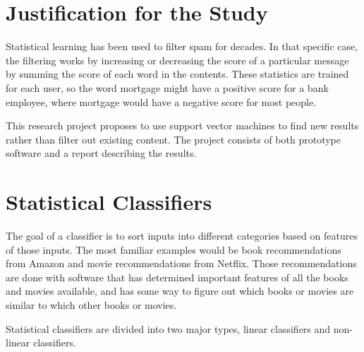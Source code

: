 \documentclass[12pt]{article}
\begin{document}
\section{Justification for the Study}
Statistical learning has been used to filter spam for decades. In that specific case, the filtering works by
increasing or decreasing the score of a particular message by summing the score of each word in the contents.
These statistics are trained for each user, so the word mortgage might have a positive score for a bank
employee, where mortgage would have a negative score for most people.

This research project proposes to use support vector machines to find new results rather than filter out
existing content. The project consists of both prototype software and a report describing the results.

\section{Statistical Classifiers}

The goal of a classifier is to sort inputs into different categories based on features of those inputs. The
most familiar examples would be book recommendations from Amazon and movie recommendations from Netflix. Those
recommendations are done with software that has determined important features of all the books and movies
available, and has some way to figure out which books or movies are similar to which other books or
movies. \cite{michie1994machine}



Statistical classifiers are divided into two major types, linear classifiers and non-linear classifiers.
\end{document}
